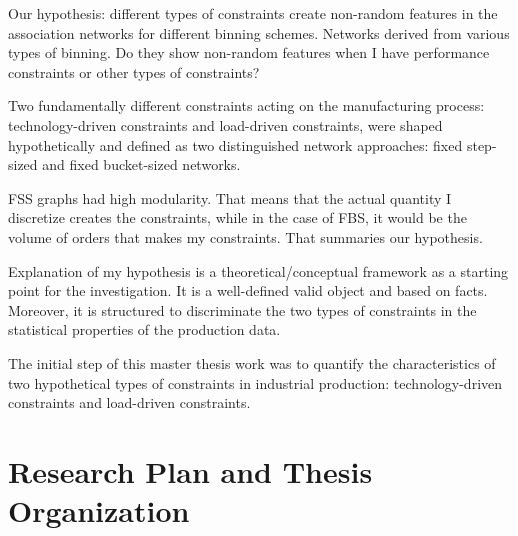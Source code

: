 {\color{red} 
	Our hypothesis: different types of constraints create non-random features in the association networks for different binning schemes. Networks derived from various types of binning. Do they show non-random features when I have performance constraints or other types of constraints?
	
	Two fundamentally different constraints acting on the manufacturing process: technology-driven constraints and load-driven constraints, were shaped hypothetically and defined as two distinguished network approaches: fixed step-sized and fixed bucket-sized networks.
	
	FSS graphs had high modularity. That means that the actual quantity I discretize creates the constraints, while in the case of FBS, it would be the volume of orders that makes my constraints. That summaries our hypothesis.
	
	Explanation of my hypothesis is a theoretical/conceptual framework as a starting point for the investigation. It is a well-defined valid object and based on facts. Moreover, it is structured to discriminate the two types of constraints in the statistical properties of the production data.
	
	The initial step of this master thesis work was to quantify the characteristics of two hypothetical types of constraints in industrial production: technology-driven constraints and load-driven constraints.
		
}

\section{Research Plan and Thesis Organization}

